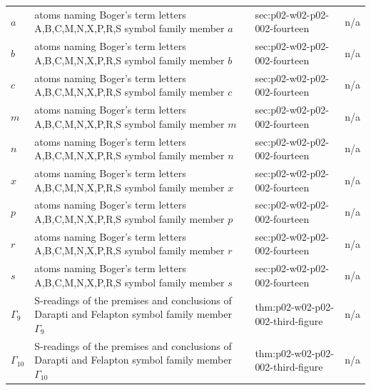 \begin{longtable}{@{}p{}p{}p{}p{}@{}}
\(a\) & atoms naming Boger's term letters A,B,C,M,N,X,P,R,S symbol family member \(a\) & sec:\allowbreak{}p02-\allowbreak{}w02-\allowbreak{}p02-\allowbreak{}002-\allowbreak{}fourteen & n/a \\
\(b\) & atoms naming Boger's term letters A,B,C,M,N,X,P,R,S symbol family member \(b\) & sec:\allowbreak{}p02-\allowbreak{}w02-\allowbreak{}p02-\allowbreak{}002-\allowbreak{}fourteen & n/a \\
\(c\) & atoms naming Boger's term letters A,B,C,M,N,X,P,R,S symbol family member \(c\) & sec:\allowbreak{}p02-\allowbreak{}w02-\allowbreak{}p02-\allowbreak{}002-\allowbreak{}fourteen & n/a \\
\(m\) & atoms naming Boger's term letters A,B,C,M,N,X,P,R,S symbol family member \(m\) & sec:\allowbreak{}p02-\allowbreak{}w02-\allowbreak{}p02-\allowbreak{}002-\allowbreak{}fourteen & n/a \\
\(n\) & atoms naming Boger's term letters A,B,C,M,N,X,P,R,S symbol family member \(n\) & sec:\allowbreak{}p02-\allowbreak{}w02-\allowbreak{}p02-\allowbreak{}002-\allowbreak{}fourteen & n/a \\
\(x\) & atoms naming Boger's term letters A,B,C,M,N,X,P,R,S symbol family member \(x\) & sec:\allowbreak{}p02-\allowbreak{}w02-\allowbreak{}p02-\allowbreak{}002-\allowbreak{}fourteen & n/a \\
\(p\) & atoms naming Boger's term letters A,B,C,M,N,X,P,R,S symbol family member \(p\) & sec:\allowbreak{}p02-\allowbreak{}w02-\allowbreak{}p02-\allowbreak{}002-\allowbreak{}fourteen & n/a \\
\(r\) & atoms naming Boger's term letters A,B,C,M,N,X,P,R,S symbol family member \(r\) & sec:\allowbreak{}p02-\allowbreak{}w02-\allowbreak{}p02-\allowbreak{}002-\allowbreak{}fourteen & n/a \\
\(s\) & atoms naming Boger's term letters A,B,C,M,N,X,P,R,S symbol family member \(s\) & sec:\allowbreak{}p02-\allowbreak{}w02-\allowbreak{}p02-\allowbreak{}002-\allowbreak{}fourteen & n/a \\
\(\Gamma_9\) & S-readings of the premises and conclusions of Darapti and Felapton symbol family member \(\Gamma_9\) & thm:\allowbreak{}p02-\allowbreak{}w02-\allowbreak{}p02-\allowbreak{}002-\allowbreak{}third-\allowbreak{}figure & n/a \\
\(\Gamma_{10}\) & S-readings of the premises and conclusions of Darapti and Felapton symbol family member \(\Gamma_{10}\) & thm:\allowbreak{}p02-\allowbreak{}w02-\allowbreak{}p02-\allowbreak{}002-\allowbreak{}third-\allowbreak{}figure & n/a \\

\end{longtable}
